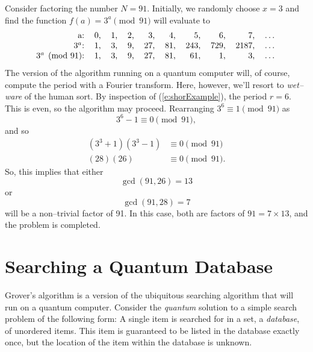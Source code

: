 Consider factoring the number $N=91$.  Initially, we randomly choose
$x=3$ and find the function $f(a)=3^a\pmod{91}$ will evaluate to
\begin{equation}
\begin{tabular}{rrrrrrrrrl}
a:& 0,& 1,& 2,& 3,& 4,& 5,& 6,& 7,& \dots\\
$3^a$:& 1,& 3,& 9,& 27,& 81,& 243,& 729,& 2187,& \dots\\
$3^a\pmod{91}$:& 1,& 3,& 9,& 27,& 81,& 61,& 1,& 3,& \dots
\end{tabular}
\label{e:shorExample}
\end{equation}
The version of the algorithm running on a quantum computer
will, of course, compute the period with a Fourier transform.
Here, however, we'll resort to \emph{wet--ware} of the human
sort.  By inspection of (\ref{e:shorExample}), the period 
$r=6$.  This is even, so the algorithm may proceed.
Rearranging $3^6\equiv 1\pmod{91}$ as
\begin{equation}
3^6-1\equiv 0\pmod{91},
\end{equation}
and so 
\begin{equation}
\begin{split}
\left(3^3+1\right)\left(3^3-1\right) &\equiv 0\pmod{91}\\
(28)(26)&\equiv 0\pmod{91}.
\end{split}
\end{equation}
So, this implies that either
\begin{equation}
\gcd(91,26)=13
\end{equation}
or
\begin{equation}
\gcd(91,28)=7
\end{equation}
will be a non--trivial factor of 91.
In this case, both are factors of $91=7\times 13$,
and the problem is completed.

\section{Searching a Quantum Database}
\label{sec:grover}

Grover's algorithm is
a version of the ubiquitous searching algorithm that will run on a quantum
computer.  Consider the {\sl quantum} solution to a simple search problem of 
the following form: A
single item is searched for in a set, a \emph{database}, of unordered items.  
This item is guaranteed to be listed in the database exactly once, but 
the location of the item within the database is unknown.

